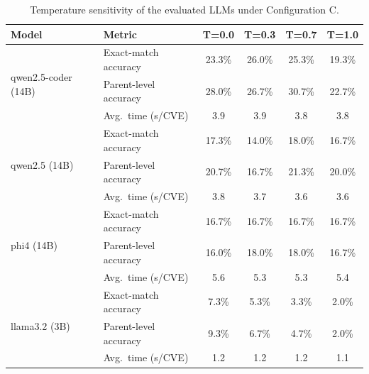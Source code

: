 \documentclass[conference,compsoc]{IEEEtran}
\begin{document}
\begin{table}[!htbp]
\centering
\caption{Temperature sensitivity of the evaluated LLMs under Configuration C.}
\label{tab:temperature_all}
\small
\begin{tabular*}{\columnwidth}{@{\extracolsep{\fill}}llcccc@{}}
\toprule
\textbf{Model} & \textbf{Metric} &
\textbf{T=0.0} & \textbf{T=0.3} & \textbf{T=0.7} & \textbf{T=1.0} \\
\midrule
\multirow{3}{*}{qwen2.5-coder (14B)}
& Exact-match accuracy  & 23.3\% & 26.0\% & 25.3\% & 19.3\% \\
& Parent-level accuracy & 28.0\% & 26.7\% & 30.7\% & 22.7\% \\
& Avg.\ time (s/CVE)    & 3.9 & 3.9 & 3.8 & 3.8 \\
\midrule
\multirow{3}{*}{qwen2.5 (14B)}
& Exact-match accuracy  & 17.3\% & 14.0\% & 18.0\% & 16.7\% \\
& Parent-level accuracy & 20.7\% & 16.7\% & 21.3\% & 20.0\% \\
& Avg.\ time (s/CVE)    & 3.8 & 3.7 & 3.6 & 3.6 \\
\midrule
\multirow{3}{*}{phi4 (14B)}
& Exact-match accuracy  & 16.7\% & 16.7\% & 16.7\% & 16.7\% \\
& Parent-level accuracy & 16.0\% & 18.0\% & 18.0\% & 16.7\% \\
& Avg.\ time (s/CVE)    & 5.6 & 5.3 & 5.3 & 5.4 \\
\midrule
\multirow{3}{*}{llama3.2 (3B)}
& Exact-match accuracy  & 7.3\% & 5.3\% & 3.3\% & 2.0\% \\
& Parent-level accuracy & 9.3\% & 6.7\% & 4.7\% & 2.0\% \\
& Avg.\ time (s/CVE)    & 1.2 & 1.2 & 1.2 & 1.1 \\
\bottomrule
\end{tabular*}
\end{table}
\end{document}
